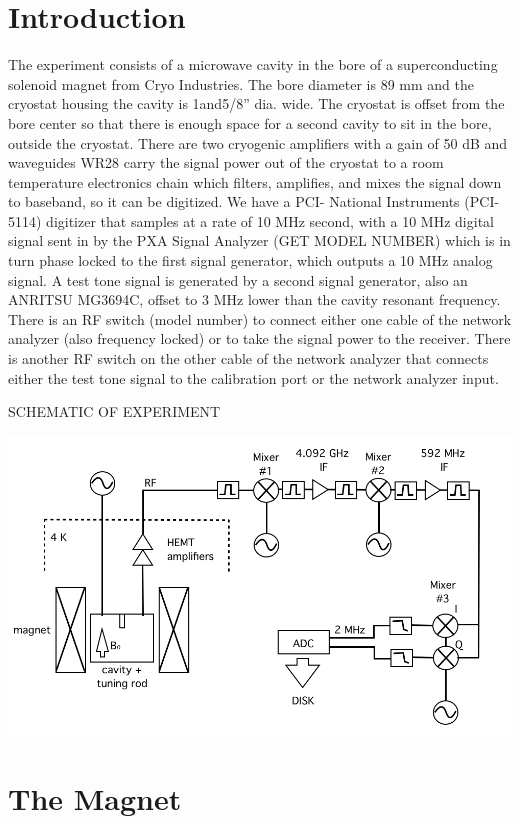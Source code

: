 \documentclass[11pt]{article}
\begin{document}
\section{Introduction}

The experiment consists of a microwave cavity in the bore of a superconducting solenoid magnet from Cryo Industries. The bore diameter is 89 mm and the cryostat housing the cavity is 1and5/8” dia. wide. The cryostat is offset from the bore center so that there is enough space for a second cavity to sit in the bore, outside the cryostat. There are two cryogenic amplifiers with a gain of 50 dB and waveguides WR28 carry the signal power out of the cryostat to a room temperature electronics chain which filters, amplifies, and mixes the signal down to baseband, so it can be digitized. We have a PCI- National Instruments (PCI-5114) digitizer that samples at a rate of 10 MHz second, with a 10 MHz digital signal sent in by the PXA Signal Analyzer (GET MODEL NUMBER) which is in turn phase locked to the first signal generator, which outputs a 10 MHz analog signal. A test tone signal is generated by a second signal generator, also an ANRITSU MG3694C, offset to 3 MHz lower than the cavity resonant frequency. There is an RF switch (model number) to connect either one cable of the network analyzer (also frequency locked) or to take the signal power to the receiver. There is another RF switch on the other cable of the network analyzer that connects either the test tone signal to the calibration port or the network analyzer input. 

SCHEMATIC OF EXPERIMENT

\includegraphics[width=\textwidth]{schematicnew}

\section{The Magnet}
\end{document}
